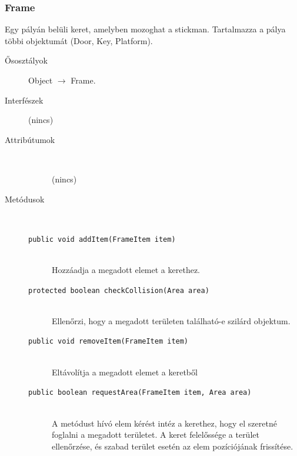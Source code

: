 		\subsubsection{Frame}
				 Egy pályán belüli keret, amelyben mozoghat a stickman. Tartalmazza a pálya többi objektumát (Door, Key, Platform). 			\begin{description}


				\item[Ősosztályok] Object $\rightarrow{}$ Frame.
				\item[Interfészek] (nincs)
				\item[Attribútumok]$\ $
					\begin{description}
						\item[] (nincs)
					\end{description}
				\item[Metódusok]$\ $
					\begin{description}
						\item[\texttt{public void addItem(FrameItem item)}] \hfill \\ Hozzáadja a megadott elemet a kerethez. 
						\item[\texttt{protected boolean checkCollision(Area area)}] \hfill \\ Ellenőrzi, hogy a megadott területen  található-e szilárd objektum. 
						\item[\texttt{public void removeItem(FrameItem item)}] \hfill \\ Eltávolítja a megadott elemet a keretből 
						\item[\texttt{public boolean requestArea(FrameItem item, Area area)}] \hfill \\ A metódust hívó elem kérést intéz a kerethez,  hogy el szeretné foglalni a megadott területet.  A keret felelőssége a terület ellenőrzése, és szabad  terület esetén az elem pozíciójának frissítése. 
					\end{description}
			\end{description}

